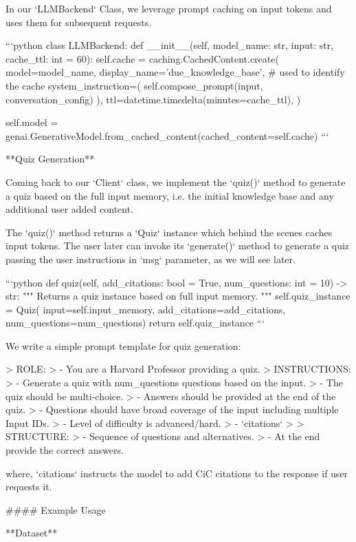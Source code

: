 {{In our `LLMBackend` Class, we leverage prompt caching on input tokens and uses them for subsequent requests.

```python
class LLMBackend:
    def __init__(self, model_name: str, input: str, cache_ttl: int = 60):
        self.cache = caching.CachedContent.create(
            model=model_name,
            display_name='due_knowledge_base', # used to identify the cache
            system_instruction=(
            self.compose_prompt(input, conversation_config)
        ),
        ttl=datetime.timedelta(minutes=cache_ttl),
    )

    self.model = genai.GenerativeModel.from_cached_content(cached_content=self.cache)
```

**Quiz Generation**

Coming back to our `Client` class, we implement the `quiz()` method to generate a quiz based on the full input memory, i.e. the initial knowledge base and any additional user added content.

The `quiz()` method returns a `Quiz` instance which behind the scenes caches input tokens. The user later can invoke its `generate()` method to generate a quiz passing the user instructions in `msg` parameter, as we will see later.

```python
    def quiz(self, add_citations: bool = True, num_questions: int = 10) -> str:
        """
        Returns a quiz instance based on full input memory.
        """
        self.quiz_instance = Quiz(
                         input=self.input_memory,
                         add_citations=add_citations,
                         num_questions=num_questions)
        return self.quiz_instance
```

We write a simple prompt template for quiz generation:

> ROLE:
> - You are a Harvard Professor providing a quiz.
> INSTRUCTIONS:
> - Generate a quiz with {num_questions} questions based on the input.
> - The quiz should be multi-choice.
> - Answers should be provided at the end of the quiz.
> - Questions should have broad coverage of the input including multiple Input IDs.
> - Level of difficulty is advanced/hard.
> - `{citations}`
>
> STRUCTURE:
> - Sequence of questions and alternatives.
> - At the end provide the correct answers.

where, `{citations}` instructs the model to add CiC citations to the response if user requests it.

#### Example Usage


**Dataset**

}}
